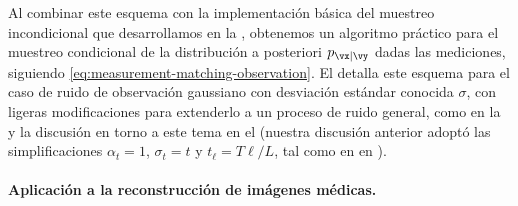 \documentclass[../../book-main_es.tex]{subfiles}
\begin{document}
Al combinar este esquema con la implementación básica del muestreo incondicional que
desarrollamos en la , obtenemos un algoritmo práctico
para el
muestreo condicional de la distribución a posteriori $p_{\vx \mid \vy}$ dadas las mediciones,
siguiendo \eqref{eq:measurement-matching-observation}.
El  detalla este esquema
para el caso de
ruido de observación gaussiano con desviación estándar conocida $\sigma$, con ligeras
modificaciones para extenderlo a un proceso de ruido general, como en la
 y la discusión en torno a este tema en el
 (nuestra discusión anterior adoptó las simplificaciones
    $\alpha_t = 1$, $\sigma_t = t$ y
    $t_{\ell} = T\ell / L$, tal como en  en
).

\paragraph{Aplicación a la reconstrucción de imágenes médicas.}
\end{document}
